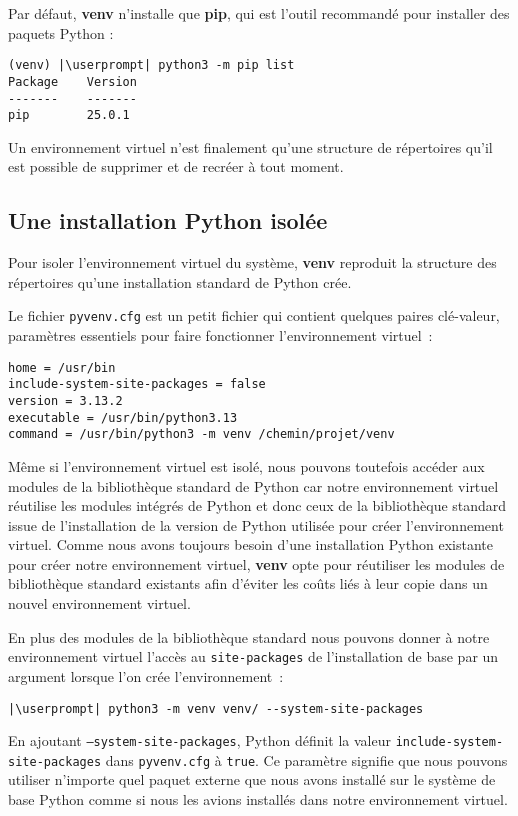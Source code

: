 Par défaut, \textbf{venv} n'installe que \textbf{pip}, qui est l'outil recommandé pour installer des paquets Python :
\begin{lstlisting}[style=bash]
(venv) |\userprompt| python3 -m pip list
Package    Version
-------    -------
pip        25.0.1
\end{lstlisting}

Un environnement virtuel n’est finalement qu’une structure de répertoires qu'il est possible de supprimer et de recréer à tout moment.

\subsection*{Une installation Python isolée}

Pour isoler l'environnement virtuel du système, \textbf{venv} reproduit la structure des répertoires qu’une installation standard de Python crée.

Le fichier \texttt{pyvenv.cfg} est un petit fichier qui contient quelques paires clé-valeur, paramètres essentiels pour faire fonctionner l'environnement virtuel :
\begin{lstlisting}[style=file]
home = /usr/bin
include-system-site-packages = false
version = 3.13.2
executable = /usr/bin/python3.13
command = /usr/bin/python3 -m venv /chemin/projet/venv
\end{lstlisting}

Même si l'environnement virtuel est isolé, nous pouvons toutefois accéder aux modules de la bibliothèque standard de Python car notre environnement virtuel réutilise les modules intégrés de Python et donc ceux de la bibliothèque standard issue de l’installation de la version de Python utilisée pour créer l'environnement virtuel. Comme nous avons toujours besoin d’une installation Python existante pour créer notre environnement virtuel, \textbf{venv} opte pour réutiliser les modules de bibliothèque standard existants afin d’éviter les coûts liés à leur copie dans un nouvel environnement virtuel.

En plus des modules de la bibliothèque standard nous pouvons donner à notre environnement virtuel l’accès au \texttt{site-packages} de l’installation de base par un argument lorsque l'on crée l’environnement :
\begin{lstlisting}[style=bash]
|\userprompt| python3 -m venv venv/ --system-site-packages
\end{lstlisting}

En ajoutant \texttt{--system-site-packages}, Python définit la valeur \texttt{include-system-}\\
\texttt{site-packages} dans \texttt{pyvenv.cfg} à \texttt{true}. Ce paramètre signifie que nous pouvons utiliser n’importe quel paquet externe que nous avons installé sur le système de base Python comme si nous les avions installés dans notre environnement virtuel.

